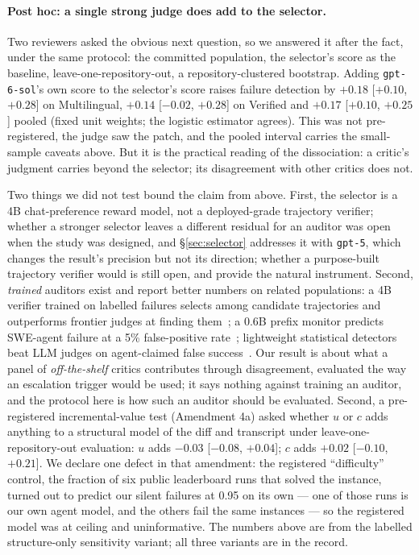 \documentclass[11pt]{article}
\begin{document}
\paragraph{Post hoc: a single strong judge does add to the selector.} Two reviewers asked the obvious next question, so we answered it after the fact, under the same protocol: the committed population, the selector's score as the baseline, leave-one-repository-out, a repository-clustered bootstrap. Adding \texttt{gpt-6-sol}'s own score to the selector's score raises failure detection by $+0.18$ [$+0.10$, $+0.28$] on Multilingual, $+0.14$ [$-0.02$, $+0.28$] on Verified and $+0.17$ [$+0.10$, $+0.25$] pooled (fixed unit weights; the logistic estimator agrees). This was not pre-registered, the judge saw the patch, and the pooled interval carries the small-sample caveats above. But it is the practical reading of the dissociation: a critic's judgment carries beyond the selector; its disagreement with other critics does not.

Two things we did not test bound the claim from above. First, the selector is a 4B chat-preference reward model, not a deployed-grade trajectory verifier; whether a stronger selector leaves a different residual for an auditor was open when the study was designed, and \S\ref{sec:selector} addresses it with \texttt{gpt-5}, which changes the result's precision but not its direction; whether a purpose-built trajectory verifier would is still open, and \citet{shum2025swerm} provide the natural instrument. Second, \emph{trained} auditors exist and report better numbers on related populations: a 4B verifier trained on labelled failures selects among candidate trajectories and outperforms frontier judges at finding them~\citep{rahman2026scout}; a 0.6B prefix monitor predicts SWE-agent failure at a 5\% false-positive rate~\citep{wang2026failfast}; lightweight statistical detectors beat LLM judges on agent-claimed false success~\citep{advani2026silent}. Our result is about what a panel of \emph{off-the-shelf} critics contributes through disagreement, evaluated the way an escalation trigger would be used; it says nothing against training an auditor, and the protocol here is how such an auditor should be evaluated. Second, a pre-registered incremental-value test (Amendment 4a) asked whether $u$ or $c$ adds anything to a structural model of the diff and transcript under leave-one-repository-out evaluation: $u$ adds $-0.03$ [$-0.08$, $+0.04$]; $c$ adds $+0.02$ [$-0.10$, $+0.21$]. We declare one defect in that amendment: the registered ``difficulty'' control, the fraction of six public leaderboard runs that solved the instance, turned out to predict our silent failures at 0.95 on its own --- one of those runs is our own agent model, and the others fail the same instances --- so the registered model was at ceiling and uninformative. The numbers above are from the labelled structure-only sensitivity variant; all three variants are in the record.
\end{document}
